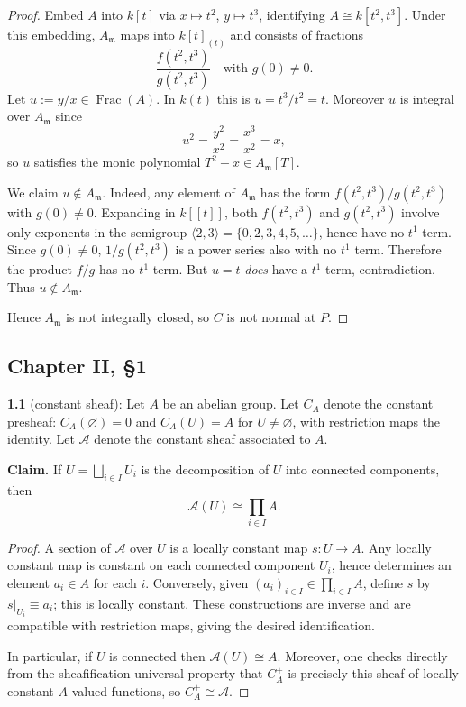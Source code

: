 \documentclass[12pt]{article}
\numberwithin{thm}{subsection}
\numberwithin{defn}{subsection}
\numberwithin{lemma}{subsection}
\numberwithin{example}{subsection}
\numberwithin{notation}{subsection}
\numberwithin{cor}{subsection}
\numberwithin{remark}{subsection}
\numberwithin{condition}{subsection}
\numberwithin{question}{subsection}
\numberwithin{construction}{subsection}
\numberwithin{construction}{subsection}
\numberwithin{construction}{subsection}
\begin{document}
\begin{proof}
Embed $A$ into $k[t]$ via $x\mapsto t^2$, $y\mapsto t^3$, identifying $A\cong k[t^2,t^3]$.
Under this embedding, $A_{\mathfrak m}$ maps into $k[t]_{(t)}$ and consists of fractions
\[
\frac{f(t^2,t^3)}{g(t^2,t^3)}\quad\text{with }g(0)\neq 0.
\]
Let $u:=y/x\in \operatorname{Frac}(A)$. In $k(t)$ this is $u=t^3/t^2=t$.
Moreover $u$ is integral over $A_{\mathfrak m}$ since
\[
u^2 = \frac{y^2}{x^2}=\frac{x^3}{x^2}=x,
\]
so $u$ satisfies the monic polynomial $T^2-x\in A_{\mathfrak m}[T]$.

We claim $u\notin A_{\mathfrak m}$. Indeed, any element of $A_{\mathfrak m}$ has the form
$f(t^2,t^3)/g(t^2,t^3)$ with $g(0)\neq 0$.
Expanding in $k[[t]]$, both $f(t^2,t^3)$ and $g(t^2,t^3)$ involve only exponents in the semigroup
$\langle 2,3\rangle=\{0,2,3,4,5,\dots\}$, hence have no $t^1$ term.
Since $g(0)\neq 0$, $1/g(t^2,t^3)$ is a power series also with no $t^1$ term.
Therefore the product $f/g$ has no $t^1$ term.
But $u=t$ \emph{does} have a $t^1$ term, contradiction.
Thus $u\notin A_{\mathfrak m}$.

Hence $A_{\mathfrak m}$ is not integrally closed, so $C$ is not normal at $P$.
\end{proof}

\subsection{Chapter II, \S 1}

\textbf{1.1} (constant sheaf):
Let $A$ be an abelian group. Let $C_A$ denote the constant presheaf:
$C_A(\varnothing)=0$ and $C_A(U)=A$ for $U\neq\varnothing$, with restriction maps the identity.
Let $\mathscr A$ denote the constant sheaf associated to $A$.

\medskip
\textbf{Claim.} If $U=\bigsqcup_{i\in I}U_i$ is the decomposition of $U$ into connected components, then
\[
\mathscr A(U)\cong \prod_{i\in I} A.
\]

\begin{proof}
A section of $\mathscr A$ over $U$ is a locally constant map $s:U\to A$.
Any locally constant map is constant on each connected component $U_i$, hence determines an element $a_i\in A$ for each $i$.
Conversely, given $(a_i)_{i\in I}\in \prod_{i\in I}A$, define $s$ by $s|_{U_i}\equiv a_i$; this is locally constant.
These constructions are inverse and are compatible with restriction maps, giving the desired identification.

In particular, if $U$ is connected then $\mathscr A(U)\cong A$.
Moreover, one checks directly from the sheafification universal property that $C_A^+$ is precisely this sheaf of locally constant
$A$-valued functions, so $C_A^+\cong \mathscr A$.
\end{proof}
\end{document}
